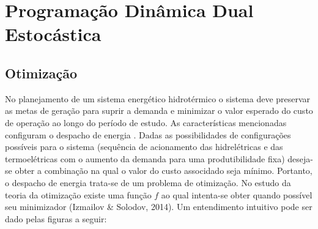 \documentclass[12pt,fleqn]{article}
\begin{document}
\section{Programa\c c\~ao Din\^amica Dual Estoc\'astica}
\subsection{Otimiza\c c\~ao}
No planejamento de um sistema energ\'etico hidrot\'ermico o sistema deve preservar as metas de gera\c c\~ao para suprir a demanda e minimizar o valor esperado do custo de
opera\c c\~ao ao longo do per\'iodo de estudo. As caracter\'isticas mencionadas configuram o despacho de energia
. Dadas as possibilidades de configura\c c\~oes poss\'iveis para o sistema (sequ\^encia de acionamento das hidrel\'etricas e das termoel\'etricas com o aumento da demanda para uma produtibilidade fixa) deseja-se obter a combina\c
c\~ao na qual o valor do custo
associdado seja m\'inimo. Portanto, o despacho de energia trata-se de um problema de otimiza\c c\~ao. No estudo da
teoria da otimiza\c c\~ao existe uma fun\c c\~ao $f$ ao qual intenta-se obter
quando poss\'ivel seu minimizador (Izmailov \& Solodov, 2014). Um entendimento intuitivo pode ser dado pelas figuras a seguir:
\end{document}
